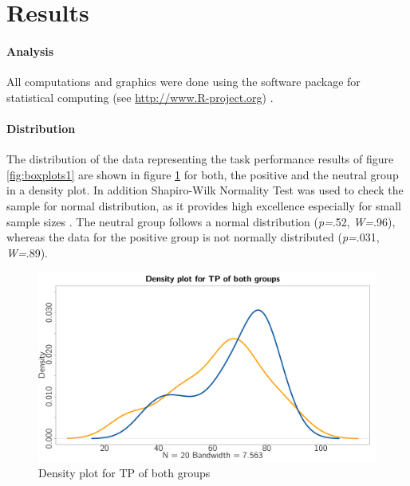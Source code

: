 \documentclass[	
	12pt, %
	a4paper, %
  abstracton
]{scrartcl}\usepackage[]{graphicx}\usepackage[]{color}
\newenvironment{knitrout}{}{} %
\begin{document}
\section*{Results}
\paragraph{Analysis}
All computations and graphics were done using the  software package for statistical computing (see \url{http://www.R-project.org}) \cite{Gandrud2013}.

\paragraph{Distribution}
The distribution of the data representing the task performance results of figure \ref{fig:boxplots1} are shown in figure \ref{fig:density} for both, the positive and the neutral group in a density plot. %
In addition Shapiro-Wilk Normality Test was used to check the sample for normal distribution, as it provides high excellence especially for small sample sizes \cite{Royston1982}. The neutral group follows a normal distribution (\textit{p=}.52, \textit{W=}.96), whereas the data for the positive group is not normally distributed (\textit{p=}.031, \textit{W=}.89).



\begin{knitrout}\footnotesize
{}\color{fgcolor}\begin{figure}[]


{\centering \includegraphics[width=.60\linewidth]{figure/beamer-density} 

}

\caption[Density plot for TP of both groups]{Density plot for TP of both groups\label{fig:density}}
\end{figure}


\end{knitrout}
\end{document}
